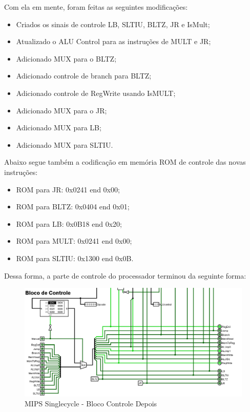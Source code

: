 \documentclass{report}
\begin{document}
        Com ela em mente, foram feitas as seguintes modificações:
        \begin{itemize}
            \item Criados os sinais de controle LB, SLTIU, BLTZ, JR e IsMult;
            \item Atualizado o ALU Control para as instruções de MULT e JR;
            \item Adicionado MUX para o BLTZ;
            \item Adicionado controle de branch para BLTZ;
            \item Adicionado controle de RegWrite usando IsMULT;
            \item Adicionado MUX para o JR;
            \item Adicionado MUX para LB;
            \item Adicionado MUX para SLTIU.
        \end{itemize}

        Abaixo segue também a codificação em memória ROM de controle das novas instruções:
        \begin{itemize}
            \item ROM para JR: 0x0241 end 0x00;
            \item ROM para BLTZ: 0x0404 end 0x01;
            \item ROM para LB: 0x0B18 end 0x20;
            \item ROM para MULT: 0x0241 end 0x00;
            \item ROM para SLTIU: 0x1300 end 0x0B.
        \end{itemize}

        Dessa forma, a parte de controle do processador terminou da seguinte forma:
        \begin{figure}[h!]
            \centering
            \includegraphics[width=\linewidth]{images/prints/Monocycle/Bloco de Controle Monocycle Depois.png}
            \caption{\label{print:singlecycle_cb_after} MIPS Singlecycle - Bloco Controle Depois}
        \end{figure}
\end{document}

